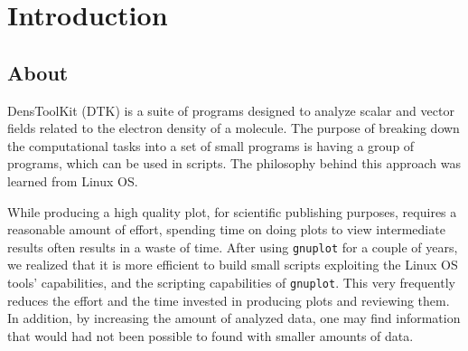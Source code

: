 

\chapter{Introduction}

\section{About \DTK}

DensToolKit (DTK) is a suite of programs designed to analyze scalar and vector fields related to the 
electron density of a molecule. The purpose of breaking down the computational tasks into a 
set of small programs 
is having a group of programs, which can be used in scripts. The philosophy behind this
approach was learned from Linux OS.

While producing a high quality plot, for scientific publishing purposes, requires a reasonable
amount of effort, spending time on doing plots to view intermediate results often results
in a waste of time. After using \texttt{gnuplot} for a couple of years, we realized that
it is more efficient to build small scripts exploiting the Linux OS tools' capabilities, and
the scripting capabilities of \texttt{gnuplot}. This very frequently reduces the effort and
the time invested in producing plots and reviewing them. In addition, by increasing the amount
of analyzed data, one may find information that would had not been possible to found with 
smaller amounts of data. 

